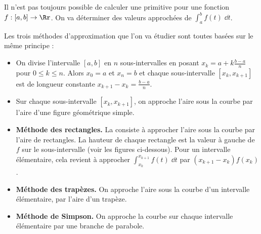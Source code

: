 \documentclass[11pt,class=report,crop=false]{standalone}
\begin{document}
\begin{cours}


Il n'est pas toujours possible de calculer une primitive pour une fonction $f : [a,b] \to \Rr$. On va déterminer des valeurs approchées de $\int_a^b f(t) \;\dd t$.

Les trois méthodes d'approximation que l'on va étudier sont toutes basées sur
le même principe : 
\begin{itemize}
  \item On divise l'intervalle $[a,b]$ en $n$ sous-intervalles en posant $x_k = a + k \frac{b-a}{n}$ pour $0\le k \le n$.
  Alors $x_0=a$ et $x_n = b$ et chaque sous-intervalle $[x_k,x_{k+1}]$ est de longueur constante $x_{k+1}-x_k= \frac{b-a}{n}$.
  
  
  

  \item Sur chaque sous-intervalle $[x_k,x_{k+1}]$, on approche l'aire sous la courbe
  par l'aire d'une figure géométrique simple.
\end{itemize}

\begin{itemize}
  \item \textbf{Méthode des rectangles.} La  consiste à approcher l'aire sous la courbe par l'aire de rectangles. La hauteur de chaque rectangle est la valeur à gauche
de $f$ sur le sous-intervalle (voir les figures ci-dessous).
Pour un intervalle élémentaire, cela revient à approcher
$\int_{x_k}^{x_{k+1}} f(t)\;\dd t$ par $(x_{k+1}-x_k) f(x_k)$.

  
  \item \textbf{Méthode des trapèzes.}
 On approche l'aire sous la courbe d'un intervalle élémentaire, 
 par l'aire d'un trapèze.
 
  
  \item \textbf{Méthode de Simpson.}
 On approche la courbe sur chaque intervalle élémentaire
par une branche de parabole. 
%
\end{itemize}  


\end{cours}
\end{document}
